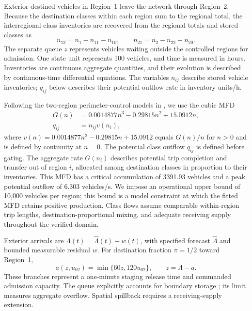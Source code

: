 \documentclass[journal,10pt]{IEEEtran}
\begin{document}
Exterior-destined vehicles in Region~1 leave the network through Region~2.
Because the destination classes within each region sum to the regional total,
the interregional class inventories are recovered from the regional totals
and stored classes as
\[
n_{12}=n_1-n_{11}-n_{10}, \qquad
n_{21}=n_2-n_{22}-n_{20}.
\]
The separate queue $z$ represents vehicles waiting outside the controlled
regions for admission. One state unit represents 100 vehicles, and time is
measured in hours. Inventories are continuous aggregate quantities, and
their evolution is described by continuous-time differential equations.
The variables $n_{ij}$ describe stored vehicle inventories; $q_{ij}$ below
describes their potential outflow rate in inventory units/h.

Following the two-region perimeter-control models in
\cite{zhong2018robust,geroliminis2013mpc}, we use the cubic MFD
\begin{equation}
\begin{aligned}
G(n)&=0.0014877n^3-0.29815n^2+15.0912n,\\
q_{ij}&=n_{ij}v(n_i),
\end{aligned}
\label{eq:new-mfd}
\end{equation}
where
$v(n)=0.0014877n^2-0.29815n+15.0912$
equals $G(n)/n$ for $n>0$ and is defined by continuity at $n=0$. The potential class outflow $q_{ij}$ is defined
before gating. The aggregate rate $G(n_i)$ describes potential trip
completion and transfer out of region $i$, allocated among destination
classes in proportion to their inventories. This MFD has a critical accumulation of 3391.93 vehicles
and a peak potential outflow of 6.303 vehicles/s. We impose an operational upper bound of 10,000 vehicles per region; this bound is a model constraint at which the fitted MFD retains positive production. Class flows assume comparable within-region trip
lengths, destination-proportional mixing, and adequate receiving supply
throughout the verified domain.

Exterior arrivals are $\Lambda(t)=\widehat\Lambda(t)+w(t)$, with specified
forecast $\widehat\Lambda$ and bounded measurable residual $w$.
For destination fraction $\pi=1/2$ toward Region~1,
\begin{equation}
a(z,u_{02})=\min\{60z,120u_{02}\},\qquad
\dot z=\Lambda-a.
\label{eq:new-admission}
\end{equation}
These branches represent a one-minute staging release time and commanded
admission capacity. The queue explicitly accounts for boundary storage
\cite{haddad2017queues}; its limit measures aggregate overflow. Spatial
spillback requires a receiving-supply extension.
\end{document}
